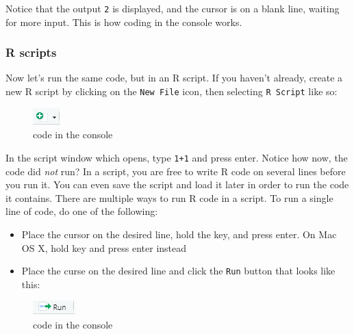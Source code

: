 \documentclass[
]{article}
\providecommand{\tightlist}{%
  \setlength{\itemsep}{0pt}\setlength{\parskip}{0pt}}
\begin{document}
Notice that the output \texttt{2} is displayed, and the cursor is on a blank line, waiting for more input. This is how coding in the console works.

\hypertarget{r-scripts}{%
\subsubsection{R scripts}\label{r-scripts}}

Now let's run the same code, but in an R script.
If you haven't already, create a new R script by clicking on the \texttt{New\ File} icon, then selecting \texttt{R\ Script} like so:

\begin{figure}

{\centering \includegraphics{src/images/rstudio_newfile} 

}

\caption{code in the console}\label{fig:unnamed-chunk-37}
\end{figure}

In the script window which opens, type \texttt{1+1} and press enter.
Notice how now, the code did \emph{not} run?
In a script, you are free to write R code on several lines before you run it.
You can even save the script and load it later in order to run the code it contains.
There are multiple ways to run R code in a script.
To run a single line of code, do one of the following:

\begin{itemize}
\tightlist
\item
  Place the cursor on the desired line, hold the key, and press enter. On Mac OS X, hold key and press enter instead
\item
  Place the curse on the desired line and click the \texttt{Run} button that looks like this:
\end{itemize}

\begin{figure}

{\centering \includegraphics{src/images/rstudio_run} 

}

\caption{code in the console}\label{fig:unnamed-chunk-38}
\end{figure}
\end{document}
